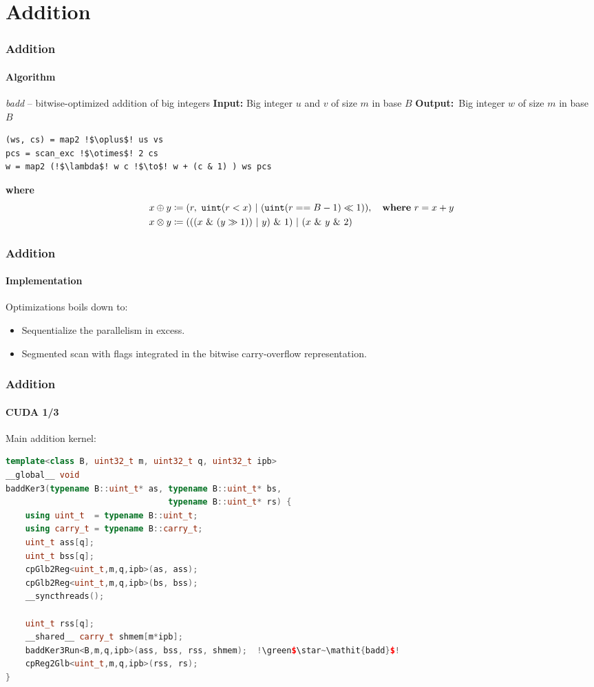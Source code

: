 \section{Addition}
\begin{frame}[fragile]
  \frametitle{Addition}
  \framesubtitle{Algorithm}
  \begin{block}{\textit{badd} -- bitwise-optimized addition of big integers}\scriptsize
    \textbf{Input:} \quad Big integer $u$ and $v$ of size $m$ in base $B$\newline
    \textbf{Output:} \,Big integer $w$ of size $m$ in base $B$\newline
\begin{lstlisting}[language=pseudo,escapeinside=!!,basicstyle=\scriptsize]
(ws, cs) = map2 !$\oplus$! us vs
pcs = scan_exc !$\otimes$! 2 cs
w = map2 (!$\lambda$! w c !$\to$! w + (c & 1) ) ws pcs
\end{lstlisting}\phantom{~}\newline
    \textbf{where}\vspace*{-0.5em}
    \begin{align}
  x \oplus y &\coloneq (r,~\mathtt{uint}(r < x)~|~(\mathtt{uint}(r == B-1) \ll 1)),\quad\textbf{where}~r = x + y \\
  x \otimes y &\coloneq (((x~\&~(y \gg 1))~|~y)~\&~1)~|~(x~\&~y~\&~2)
      \end{align}
  \end{block}
\end{frame}

\begin{frame}[fragile]
  \frametitle{Addition}
  \framesubtitle{Implementation}
  Optimizations boils down to:
  \begin{itemize}
    \item Sequentialize the parallelism in excess.
    \item Segmented scan with flags integrated in the bitwise carry-overflow representation.
    \end{itemize}
\end{frame}

\begin{frame}[fragile]
  \frametitle{Addition}
  \framesubtitle{CUDA 1/3}
  Main addition kernel:
\begin{lstlisting}[language=CPP,gobble=0,basicstyle=\scriptsize,escapeinside=!!]
template<class B, uint32_t m, uint32_t q, uint32_t ipb>
__global__ void
baddKer3(typename B::uint_t* as, typename B::uint_t* bs,
                                 typename B::uint_t* rs) {
    using uint_t  = typename B::uint_t;
    using carry_t = typename B::carry_t;
    uint_t ass[q];
    uint_t bss[q];
    cpGlb2Reg<uint_t,m,q,ipb>(as, ass);
    cpGlb2Reg<uint_t,m,q,ipb>(bs, bss);
    __syncthreads();

    uint_t rss[q];
    __shared__ carry_t shmem[m*ipb];
    baddKer3Run<B,m,q,ipb>(ass, bss, rss, shmem);  !\green$\star~\mathit{badd}$!
    cpReg2Glb<uint_t,m,q,ipb>(rss, rs);
}
\end{lstlisting}
\end{frame}

